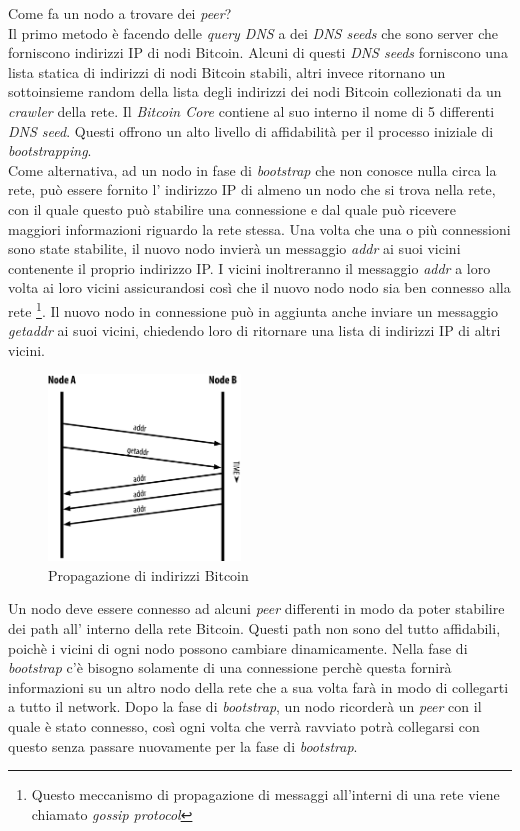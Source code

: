 Come fa un nodo a trovare dei \textit{peer}?\\
Il primo metodo \`e facendo delle \textit{query DNS} a  dei \textit{DNS seeds} che sono server che forniscono indirizzi IP di nodi Bitcoin. Alcuni di questi \textit{DNS seeds} forniscono una lista statica di indirizzi di nodi Bitcoin stabili, altri invece ritornano un sottoinsieme random della lista degli indirizzi dei nodi Bitcoin collezionati da un \textit{crawler} della rete. Il \textit{Bitcoin Core} contiene al suo interno il nome di 5 differenti \textit{DNS seed}. Questi offrono un alto livello di affidabilit\`a per il processo iniziale di \textit{bootstrapping}.\\
Come alternativa, ad un nodo in fase di \textit{bootstrap} che non conosce nulla circa la rete, pu\`o essere fornito l' indirizzo IP di almeno un nodo che si trova nella rete, con il quale questo pu\`o stabilire una connessione e dal quale pu\`o ricevere maggiori informazioni riguardo la rete stessa. 
Una volta che una o pi\`u connessioni sono state stabilite, il nuovo nodo invier\`a un messaggio \textit{addr} ai suoi vicini contenente il proprio indirizzo IP. I vicini inoltreranno il messaggio \textit{addr} a loro volta ai loro vicini assicurandosi cos\`i che il nuovo nodo nodo sia ben connesso alla rete \footnote{Questo meccanismo di propagazione di messaggi all'interni di una rete viene chiamato \textit{gossip protocol}}. Il nuovo nodo in connessione pu\`o in aggiunta anche inviare un messaggio \textit{getaddr} ai suoi vicini, chiedendo loro di ritornare una lista di indirizzi IP di altri vicini.
\begin{figure}[!htb]
\begin{center}
   \includegraphics[width=0.455\textwidth]{imgs/addr.png}
   \caption{Propagazione di indirizzi Bitcoin}
   \end{center}
   \hfill
\end{figure}
Un nodo deve essere connesso ad alcuni \textit{peer} differenti in modo da poter stabilire dei path all' interno della rete Bitcoin. Questi path non sono del tutto affidabili, poich\`e i vicini di ogni nodo possono cambiare dinamicamente. Nella fase di \textit{bootstrap} c'\`e bisogno solamente di una connessione perch\`e questa fornir\`a informazioni su un altro nodo della rete che a sua volta far\`a in modo di collegarti a tutto il network. Dopo la fase di \textit{ bootstrap}, un nodo ricorder\`a un \textit{peer} con il quale \`e stato connesso, cos\`i ogni volta che verr\`a ravviato potr\`a collegarsi con questo senza passare nuovamente per la fase di \textit{bootstrap}.\\
